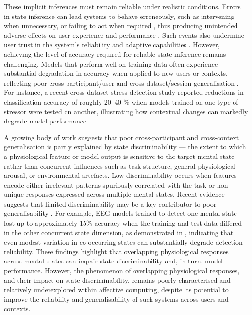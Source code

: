 \documentclass[lettersize,journal]{IEEEtran}
\begin{document}
These implicit inferences must remain reliable under realistic conditions. Errors in state inference can lead systems to behave erroneously, such as intervening when unnecessary, or failing to act when required \cite{novakEffectsAdaptationAccuracy2024a, aricoAdaptiveAutomationTriggered2016}, thus producing unintended adverse effects on user experience and performance \cite{forbes-rileyUsingPerformanceTrajectories2011, novakEffectsAdaptationAccuracy2024a}. Such events also undermine user trust in the system’s reliability and adaptive capabilities \cite{hossainDifferentAdaptationError2025, hollandCalibratingTrustReliance2024, demirezenReproducibleMachineLearning2024}. However, achieving the level of accuracy required for reliable state inference remains challenging. Models that perform well on training data often experience substantial degradation in accuracy when applied to new users or contexts, reflecting poor cross-participant/user and cross-dataset/session generalisation \cite{demirezenReproducibleMachineLearning2024, vosGeneralizableMachineLearning2023, benchekrounCrossDatasetAnalysis2023}. For instance, a recent cross-dataset stress-detection study reported reductions in classification accuracy of roughly 20–40 \% when models trained on one type of stressor were tested on another, illustrating how contextual changes can markedly degrade model performance \cite{prajodStressorTypeMatters2024}.

A growing body of work suggests that poor cross-participant and cross-context generalisation is partly explained by state discriminability — the extent to which a physiological feature or model output is sensitive to the target mental state rather than concurrent influences such as task structure, general physiological arousal, or environmental artefacts. Low discriminability occurs when features encode either irrelevant patterns spuriously correlated with the task or non-unique responses expressed across multiple mental states. Recent evidence suggests that limited discriminability may be a key contributor to poor generalisability \cite{parentDiagnosticityPsychophysiologicalSignatures2019, bagheriEEGbasedDetectionMental2020, bagheriSimultaneousClassificationBoth2022}. For example, EEG models trained to detect one mental state lost up to approximately 15\% accuracy when the training and test data differed in the other concurrent state dimension, as demonstrated in \cite{bagheriEEGbasedDetectionMental2020}, indicating that even modest variation in co-occurring states can substantially degrade detection reliability. These findings highlight that overlapping physiological responses across mental states can impair state discriminability and, in turn, model performance. However, the phenomenon of overlapping physiological responses, and their impact on state discriminability, remains poorly characterised and relatively underexplored within affective computing, despite its potential to improve the reliability and generalisability of such systems across users and contexts.
\end{document}
